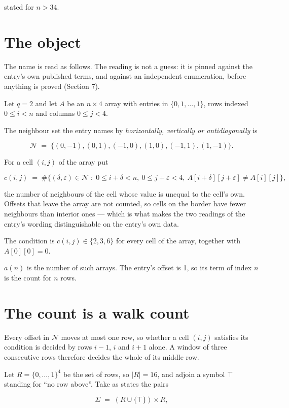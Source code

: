 \documentclass[11pt]{article}
\theoremstyle{definition}
\begin{document}
stated for $n > 34$.

\section{The object}

The name is read as follows. The reading is not a guess: it is pinned against the entry's own published terms, and against an independent enumeration, before anything is proved (Section 7).

Let $q = 2$ and let $A$ be an $n \times 4$ array with entries in $\{0,1,\dots,1\}$, rows indexed $0 \le i < n$ and columns $0 \le j < 4$.

The neighbour set the entry names by {\itshape horizontally, vertically or antidiagonally} is

\[\mathcal{N} \;=\; \{(0,-1), (0,1), (-1,0), (1,0), (-1,1), (1,-1)\}.\]

For a cell $(i,j)$ of the array put

\[c(i,j) \;=\; \#\bigl\{(\delta,\varepsilon)\in\mathcal{N} \;:\; 0\le i+\delta<n,\ 0\le j+\varepsilon<4,\ A[i+\delta][j+\varepsilon] \neq A[i][j]\bigr\},\]

the number of neighbours of the cell whose value is unequal to the cell's own. Offsets that leave the array are not counted, so cells on the border have fewer neighbours than interior ones --- which is what makes the two readings of the entry's wording distinguishable on the entry's own data.

The condition is $c(i,j) \in \{2, 3, 6\}$ for every cell of the array, together with $A[0][0]=0$.

$a(n)$ is the number of such arrays. The entry's offset is 1, so its term of index $n$ is the count for $n$ rows.

\section{The count is a walk count}

Every offset in $\mathcal{N}$ moves at most one row, so whether a cell $(i,j)$ satisfies its condition is decided by rows $i-1$, $i$ and $i+1$ alone. A window of three consecutive rows therefore decides the whole of its middle row.

Let $R = \{0,\dots,1\}^{4}$ be the set of rows, so $|R| = 16$, and adjoin a symbol $\top$ standing for ``no row above''. Take as states the pairs

\[\Sigma \;=\; (R \cup \{\top\}) \times R,\]
\end{document}
